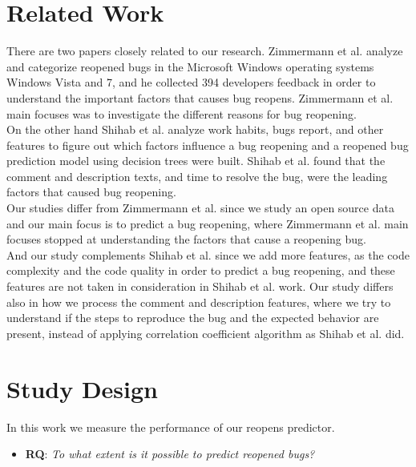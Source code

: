 \documentclass[sigconf,review]{acmart}
\begin{document}
\section{Related Work}
There are two papers closely related to our research. Zimmermann et al. \cite{Zimmerman:reopen} analyze and categorize reopened bugs in the Microsoft Windows operating systems Windows Vista and 7, and he collected 394 developers feedback in order to understand the important factors that causes bug reopens. Zimmermann et al. main focuses was to investigate the different reasons for bug reopening.\\
On the other hand Shihab et al.\cite{Shihab:wcre} analyze work habits, bugs report, and other features to figure out which factors influence a bug reopening and a reopened bug prediction model using decision trees were built. Shihab et al. found that the comment and description texts, and time to resolve the bug, were the leading factors that caused bug reopening. \\
Our studies differ from Zimmermann et al. since we study an open source data and our main focus is to predict a bug reopening, where Zimmermann et al. main focuses stopped at understanding the factors that cause a reopening bug.\\
And our study complements Shihab et al.\cite{Shihab:wcre} since we add more features, as the code complexity and the code quality in order to predict a bug reopening, and these features are not taken in consideration in Shihab et al. work. Our study differs also in how we process the comment and description features, where we try to understand if the steps to reproduce the bug and the expected behavior are present, instead of applying correlation coefficient algorithm as Shihab et al. did.


\section{Study Design}
In this work we measure the performance of our reopens predictor.
\begin{itemize}
\item \textbf{RQ}: \emph{To what extent is it possible to predict reopened bugs?}
\end{itemize}
\end{document}
